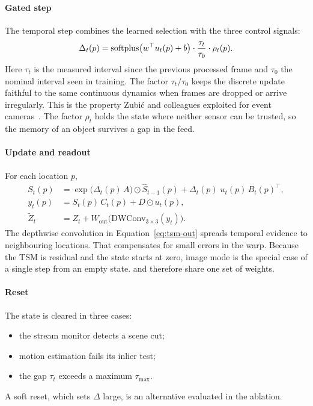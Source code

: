 \paragraph{Gated step}
The temporal step combines the learned selection with the three control
signals:
\begin{equation}
  \Delta_t(p) = \operatorname{softplus}\bigl(w^{\top} u_t(p) + b\bigr)\cdot
  \frac{\tau_t}{\tau_0}\cdot \rho_t(p).
  \label{eq:tsm-delta}
\end{equation}
Here $\tau_t$ is the measured interval since the previous processed frame
and $\tau_0$ the nominal interval seen in training. The factor $\tau_t/\tau_0$
keeps the discrete update faithful to the same continuous dynamics when
frames are dropped or arrive irregularly. This is the property Zubi\'c and
colleagues exploited for event cameras~\citep{zubic2024ssmevent}. The factor
$\rho_t$ holds the state where neither sensor can be trusted, so the memory
of an object survives a gap in the feed.

\paragraph{Update and readout}
For each location $p$,
\begin{align}
  S_t(p) &= \exp\bigl(\Delta_t(p)\,A\bigr)\odot \hat S_{t-1}(p)
            + \Delta_t(p)\; u_t(p)\, B_t(p)^{\top}, \label{eq:tsm-update}\\
  y_t(p) &= S_t(p)\, C_t(p) + D\odot u_t(p), \label{eq:tsm-read}\\
  \tilde Z_t &= Z_t + W_{\text{out}}\bigl(\mathrm{DWConv}_{3\times3}(y_t)\bigr).
  \label{eq:tsm-out}
\end{align}
The depthwise convolution in Equation~\eqref{eq:tsm-out} spreads temporal
evidence to neighbouring locations. That compensates for small errors in
the warp. Because the TSM is residual and the state starts at zero,
image mode is the special case of a single step from an empty state.
\method{} and \methodS{} therefore share one set of weights.

\paragraph{Reset}
The state is cleared in three cases:
\begin{itemize}
  \item the stream monitor detects a scene cut;
  \item motion estimation fails its inlier test;
  \item the gap $\tau_t$ exceeds a maximum $\tau_{\max}$.
\end{itemize}
A soft reset, which sets $\Delta$ large, is an alternative evaluated in the
ablation.

